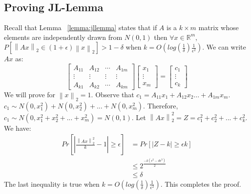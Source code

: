 \documentclass[11pt]{article}
\newcommand{\norm}[1]{\left\lVert#1\right\rVert}
\begin{document}
\subsection{Proving JL-Lemma}
\label{sec:jllemmaproof}
Recall that Lemma ~\ref{lemma:jllemma} states that if $A$ is a $k\times m$ matrix whose elements are independently drawn from $N(0,1)$ then $\forall x\in \mathbb{R}^m$, $P\left[\norm{Ax}_2\in (1+\epsilon) \norm{x}_2 \right]>1-\delta$ when $k=O\left(log(\frac{1}{\delta})\frac{1}{\epsilon^2}\right)$. We can write $Ax$ as: \\
\[
\begin{bmatrix}
 A_{11} & A_{12} & \cdots & A_{1m} \\
 \vdots & \vdots & \vdots & \vdots \\
 A_{k1} & A_{k2} & \cdots & A_{km} 
\end{bmatrix}
\begin{bmatrix}
 x_1 \\
 \vdots\\
 x_m
\end{bmatrix}
=
\begin{bmatrix}
 c_1 \\
 \vdots\\
 c_k
\end{bmatrix}
\]
We will prove for $\norm{x}_2=1$. Observe that $c_1=A_{11}x_1 + A_{12}x_2... + A_{1m}x_m$. $c_1\sim N(0,x_1^2) + N(0,x_2^2) + ... + N(0,x_m^2)$. Therefore, $c_1\sim N(0, x_1^2 + x_2^2 + ... + x_m^2)=N(0,1)$. Let $\norm{Ax}_2^2=Z=c_1^2+c_2^2+...+c_k^2$. We have:
\begin{equation}
\begin{split}
Pr\left[\left| \frac{\norm{Ax}_2^2}{k} - 1 \right| \geq \epsilon \right] &= Pr\left[|Z-k| \geq \epsilon k\right] \\
&\leq 2^{\frac{-k(\epsilon^2-d\epsilon^3)}{2}} \\
&\leq \delta
\end{split}
\end{equation}
The last inequality is true when $k=O\left(log(\frac{1}{\delta})\frac{1}{\epsilon^2}\right)$. This completes the proof.
\end{document}
